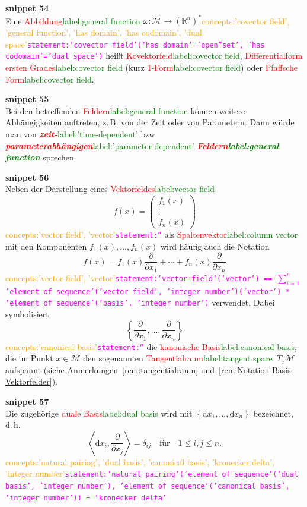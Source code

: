 \documentclass[a4paper,twoside,english,ngerman,deutsch,german,sectrefs,envcountsame,envcountchap]{svmono}
\newcommand{\setref}[2]{\textcolor{red}{#1}\textcolor{green}{#2}}
\newcommand{\snippet}[1]{\textbf{snippet #1}\\}
\newcommand{\eqnote}[2]{\textcolor{orange}{#1}\textcolor{magenta}{\texttt{#2}}}
\begin{document}
\snippet{54}
Eine \setref{Abbildung}{label:general function} $\omega:\mathcal{M}\to({\mathbb{R}}^{n})^{*}$\eqnote{concepts:'covector field', 'general function', 'has domain', 'has codomain', 'dual space'}{statement:'covector field'('has domain'='open''set', 'has codomain'='dual space')} heißt \setref{Kovektorfeld}{label:covector field}, \setref{Differentialform ersten Grades}{label:covector field}
(kurz \setref{1-Form}{label:covector field}) oder \setref{Pfaffsche Form}{label:covector field}.

\snippet{55}
Bei den betreffenden
\setref{Feldern}{label:general function} können weitere Abhängigkeiten auftreten, z.\,B. von der Zeit
oder von Parametern. Dann würde man von \setref{\textbf{\em zeit-}}{label:'time-dependent'} bzw. \setref{\textbf{\em parameterabhängigen}}{label:'parameter-dependent'}
\textbf{\em \setref{Feldern}{label:general function}} sprechen.

\snippet{56}

Neben der Darstellung eines \setref{Vektorfeldes}{label:vector field}
\[
f(x)=\left(\begin{array}{c}
f_{1}(x)\\
\vdots\\
f_{n}(x)
\end{array}\right)
\]\eqnote{concepts:'vector field', 'vector'}{statement:''}
als \setref{Spaltenvektor}{label:column vector} mit den Komponenten $f_{1}(x),\ldots,f_{n}(x)$
wird häufig auch die Notation
\begin{equation}
f(x)=f_{1}(x)\frac{\partial}{\partial x_{1}}+\cdots+f_{n}(x)\frac{\partial}{\partial x_{n}}\label{eq:Basisdarstellung-Vektorfelder}
\end{equation}\eqnote{concepts:'vector field', 'vector'}{statement:'vector field'('vector') == $\sum_{i=1}^n$ 'element of sequence'('vector field', 'integer number')('vector') * 'element of sequence'('basis', 'integer number')}
verwendet.
Dabei symbolisiert
\begin{equation}
\left\{ \frac{\partial}{\partial x_{1}},\ldots,\frac{\partial}{\partial x_{n}}\right\} \label{eq:Basisvektorfelder}
\end{equation}\eqnote{concepts:'canonical basis'}{statement:''}
die \setref{kanonische Basis}{label:canonical basis}, die im Punkt $x\in\mathcal{M}$ den sogenannten
\setref{Tangential\-raum}{label:tangent space}~$T_{x}\mathcal{M}$
aufspannt (siehe Anmerkungen~\ref{rem:tangentialraum} und~\ref{rem:Notation-Basis-Vektorfelder}).

\snippet{57}
Die zugehörige \setref{duale Basis}{label:dual basis} wird mit $\left\{ {\mathrm{d}} x_{1},\dots,{\mathrm{d}} x_{n}\right\} $
bezeichnet, d.\,h.
\[
\left\langle {\mathrm{d}} x_{i},\frac{\partial}{\partial x_{j}}\right\rangle =\delta_{ij}\quad\textrm{für}\quad1\leq i,j\leq n.
\]\eqnote{concepts:'natural pairing', 'dual basis', 'canonical basis', 'kronecker delta', 'integer number'}{statement:'natural pairing'('element of sequence'('dual basis', 'integer number'), 'element of sequence'('canonical basis', 'integer number')) = 'kronecker delta'}
\end{document}
